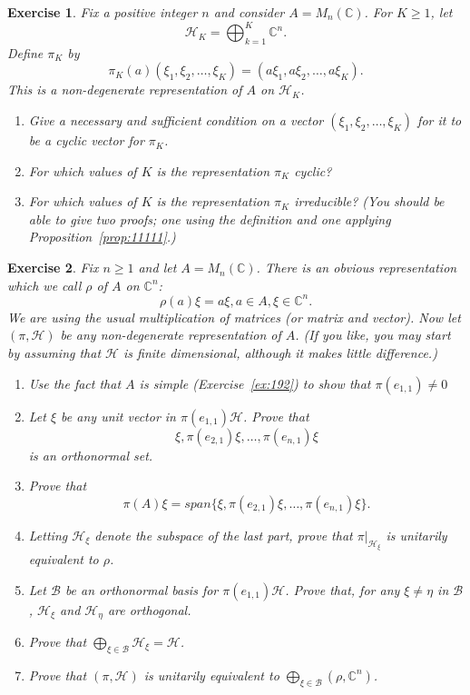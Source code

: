 \documentclass{book}
\newtheorem{exercise}{Exercise}[section]
\begin{document}
\begin{exercise}
  Fix a positive integer \(n\) and consider \(A = M_n(\mathbb{C})\). For
  \(K \geq 1\), let
  \[
  \mathcal{H}_K =\bigoplus^K_{k=1} \mathbb{C}^n.
  \]
  Define \(\pi_K\) by
  \[\pi_K(a)(\xi_1,\xi_2,\ldots,\xi_K) = (a\xi_1,a\xi_2,\ldots,a\xi_K).\]
  This is a non-degenerate representation of \(A\) on \(\mathcal{H}_K\).
  \begin{enumerate}
    \item Give a necessary and sufficient condition on a vector \((\xi_1,\xi_2,\ldots,\xi_K)\)
    for it to be a cyclic vector for \(\pi_K\).
    \item For which values of \(K\) is the representation \(\pi_K\) cyclic?
    \item For which values of \(K\) is the representation \(\pi_K\) irreducible? (You should
    be able to give two proofs; one using the definition and one applying
    Proposition~\ref{prop:11111}.)
  \end{enumerate}
\end{exercise}
\begin{exercise}
  Fix \(n \geq 1\) and let \(A = M_n(\mathbb{C})\). There is an obvious
  representation which we call \(\rho\) of \(A\) on \(\mathbb{C}^n\):
  \[\rho(a)\xi = a\xi,a \in A,\xi \in \mathbb{C}^n.\]
  We are using the usual multiplication of matrices (or matrix and vector).
  Now let \((\pi,\mathcal{H})\) be any non-degenerate representation of \(A\). (If you like,
  you may start by assuming that \(\mathcal{H}\) is finite dimensional, although it makes
  little difference.)
  \begin{enumerate}
    \item Use the fact that \(A\) is simple (Exercise~\ref{ex:192}) to show that \(\pi(e_{1,1})\neq 0\)
    \item Let \(\xi\) be any unit vector in \(\pi(e_{1,1})\mathcal{H}\). Prove that
    \[\xi, \pi(e_{2,1})\xi, \ldots , \pi(e_{n,1})\xi\]
    is an orthonormal set.
    \item Prove that
    \[\pi(A)\xi = span\{\xi,\pi(e_{2,1})\xi,\ldots,\pi(e_{n,1})\xi\}.\]
    \item Letting \(\mathcal{H}_\xi\) denote the subspace of the last part, prove that \(\pi|_{\mathcal{H}_\xi}\) 
    is unitarily equivalent to \(\rho\).
    \item Let \(\mathcal{B}\) be an orthonormal basis for \(\pi(e_{1,1})\mathcal{H}\). Prove that, for any \(\xi\neq \eta\)
    in \(\mathcal{B}\), \(\mathcal{H}_\xi\) and \(\mathcal{H}_\eta\) are orthogonal.
    \item Prove that \(\bigoplus_{\xi\in\mathcal{B}}\mathcal{H}_\xi = \mathcal{H}\).
    \item Prove that \((\pi,\mathcal{H})\) is unitarily equivalent to \(\bigoplus_{\xi\in\mathcal{B}}(\rho,\mathbb{C}^n)\).
  \end{enumerate}
\end{exercise}
\end{document}
